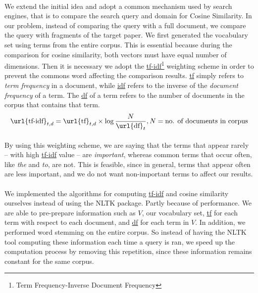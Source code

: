 \documentclass[12 pt]{article}
\begin{document}
\paragraph{}
We extend the initial idea and adopt a common mechanism used by search engines, that is to compare the search query and domain for Cosine Similarity. In our problem, instead of comparing the query with a full document, we compare the query with fragments of the target paper. We first generated the vocabulary set using terms from the entire corpus. This is essential because during the comparison for cosine similarity, both vectors must have equal number of dimensions.
Then it is necessary we adopt the \url{tf-idf}\footnote{Term Frequency-Inverse Document Frequency} weighting scheme in order to prevent the commons word affecting the comparison results. \url{tf} simply refers to \textit{term frequency} in a document, while \url{idf} refers to the inverse of the \textit{document frequency} of a term. The \url{df} of a term refers to the number of documents in the corpus that contains that term.
\begin{equation}
\text{\url{tf-idf}}_{t,d} = \text{\url{tf}}_{t,d} \times \log{\frac{N}{\text{\url{df}}_t}}, N=\text{no. of documents in corpus}
\end{equation}
\paragraph{}
By using this weighting scheme, we are saying that the terms that appear rarely -- with high \url{tf-idf} value -- are \textit{important}, whereas common terms that occur often, like \textit{the} and \textit{to}, are not. This is feasible, since in general, terms that appear often are less important, and we do not want non-important terms to affect our results.

\paragraph{}
We implemented the algorithms for computing \url{tf-idf} and cosine similarity ourselves instead of using the NLTK package. Partly because of performance. We are able to pre-prepare information such as $V$, our vocabulary set, \url{tf} for each term with respect to each document, and \url{df} for each term in $V$. In addition, we performed word stemming on the entire corpus. So instead of having the NLTK tool computing these information each time a query is ran, we speed up the computation process by removing this repetition, since these information remains constant for the same corpus.
\end{document}
